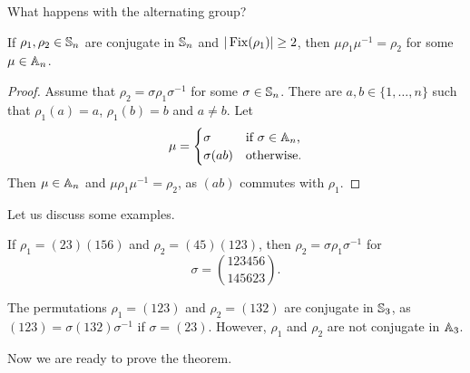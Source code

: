 What happens with the alternating group? 

\begin{lemma}
If $\rho_1,\rho_2\in\mathbb{S}_n$ are conjugate in $\mathbb{S}_n$ and  $|\operatorname{Fix}(\rho_1)|\geq2$, then 
$\mu\rho_1\mu^{-1}=\rho_2$ for some $\mu\in\mathbb{A}_n$.  
\end{lemma}

\begin{proof}
Assume that $\rho_2=\sigma\rho_1\sigma^{-1}$ for some $\sigma\in\mathbb{S}_n$. 
There are $a,b\in\{1,\dots,n\}$ such that
$\rho_1(a)=a$, $\rho_1(b)=b$ and $a\ne b$. Let 
\[
\mu=\begin{cases}
\sigma & \text{if $\sigma\in\mathbb{A}_n$,}\\
\sigma(ab) & \text{otherwise.}
\end{cases}
\]
Then $\mu\in\mathbb{A}_n$ and $\mu\rho_1\mu^{-1}=\rho_2$, as 
$(ab)$ commutes with $\rho_1$. 
\end{proof}

Let us discuss some examples.

\begin{example}
If $\rho_1=(23)(156)$ and $\rho_2=(45)(123)$, then 
$\rho_2=\sigma\rho_1\sigma^{-1}$ for  
\[
\sigma=\binom{123456}{145623}.
\]
\end{example}

\begin{example}
The permutations $\rho_1=(123)$ and $\rho_2=(132)$ are conjugate 
in $\mathbb{S}_3$, as  
$(123)=\sigma(132)\sigma^{-1}$ if $\sigma=(23)$. However, $\rho_1$ and $\rho_2$ are not conjugate in $\mathbb{A}_3$. 
\end{example}

Now we are ready to prove the theorem. 

